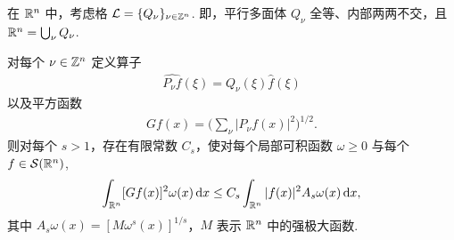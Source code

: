 \begin{lemma}\label{lem:5.9}
在 $\mathbb{R}^n$ 中，考虑格 $\mathcal{L} = \{Q_\nu\}_{\nu \in \mathbb{Z}^n}$. 即，平行多面体 $Q_\nu$ 全等、内部两两不交，且 $\mathbb{R}^n = \bigcup_\nu Q_\nu$.

对每个 $\nu \in \mathbb{Z}^n$ 定义算子
\begin{align*}
  \widehat{P_{\nu}f}(\xi)=Q_{\nu}(\xi)\widehat{f}(\xi)
\end{align*}
以及平方函数
\begin{align*}
  G f(x)=\Big(\sum_{\nu}|P_{\nu}f(x)|^{2}\Big)^{1/2}.
\end{align*}
则对每个 $s > 1$，存在有限常数 $C_s$，使对每个局部可积函数 $\omega \geq 0$ 与每个 $f \in \mathcal{S}(\mathbb{R}^n)$,
\begin{align*}
  \int_{\mathbb{R}^{n}}[G f(x)]^{2}\omega(x)\,\mathrm{d}x
  \leq C_{s}\int_{\mathbb{R}^{n}}|f(x)|^{2}A_{s}\omega(x)\,\mathrm{d}x,
\end{align*}
其中 $A_{s}\omega(x)=[M\omega^{s}(x)]^{1/s}$，$M$ 表示 $\mathbb{R}^{n}$ 中的强极大函数.
\end{lemma}

